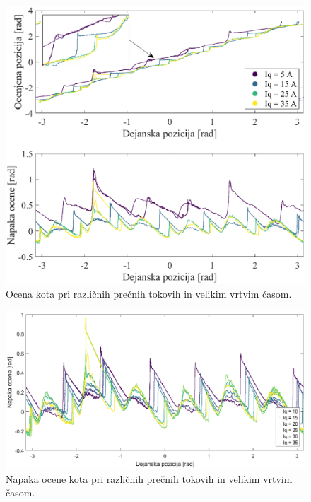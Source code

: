 \documentclass[a4paper,twoside,openright,12pt,slovene]{book}
\begin{document}

\begin{figure}[!htbp]
    \centering
    \includegraphics[width=0.9\columnwidth]{Slike/vsiljenaPozicijaTokoviZMrtvimCasom_angle.eps}
    \caption{\label{vsiljenaPozicijaTokoviZMrtvimCasom_angle} Ocena kota pri različnih prečnih tokovih in velikim vrtvim časom. }
\end{figure}

\begin{figure}[!htbp]
    \centering
    \includegraphics[width=1.05\columnwidth]{Slike/vsiljenaPozicijaTokoviZMrtvimCasom_angleError.eps}
    \caption{\label{vsiljenaPozicijaTokoviZMrtvimCasom_angleError} Napaka ocene kota pri različnih prečnih tokovih in velikim vrtvim časom. }
\end{figure}
\end{document}
